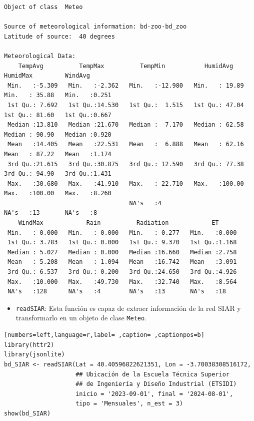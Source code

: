 \begin{verbatim}
Object of class  Meteo 

Source of meteorological information: bd-zoo-bd_zoo 
Latitude of source:  40 degrees

Meteorological Data:
    TempAvg          TempMax          TempMin           HumidAvg         HumidMax         WindAvg     
 Min.   :-5.309   Min.   :-2.362   Min.   :-12.980   Min.   : 19.89   Min.   : 35.88   Min.   :0.251  
 1st Qu.: 7.692   1st Qu.:14.530   1st Qu.:  1.515   1st Qu.: 47.04   1st Qu.: 81.60   1st Qu.:0.667  
 Median :13.810   Median :21.670   Median :  7.170   Median : 62.58   Median : 90.90   Median :0.920  
 Mean   :14.405   Mean   :22.531   Mean   :  6.888   Mean   : 62.16   Mean   : 87.22   Mean   :1.174  
 3rd Qu.:21.615   3rd Qu.:30.875   3rd Qu.: 12.590   3rd Qu.: 77.38   3rd Qu.: 94.90   3rd Qu.:1.431  
 Max.   :30.680   Max.   :41.910   Max.   : 22.710   Max.   :100.00   Max.   :100.00   Max.   :8.260  
                                   NA's   :4                          NA's   :13       NA's   :8      
    WindMax            Rain          Radiation            ET       
 Min.   : 0.000   Min.   : 0.000   Min.   : 0.277   Min.   :0.000  
 1st Qu.: 3.783   1st Qu.: 0.000   1st Qu.: 9.370   1st Qu.:1.168  
 Median : 5.027   Median : 0.000   Median :16.660   Median :2.758  
 Mean   : 5.208   Mean   : 1.094   Mean   :16.742   Mean   :3.091  
 3rd Qu.: 6.537   3rd Qu.: 0.200   3rd Qu.:24.650   3rd Qu.:4.926  
 Max.   :10.000   Max.   :49.730   Max.   :32.740   Max.   :8.564  
 NA's   :128      NA's   :4        NA's   :13       NA's   :18
\end{verbatim}

\begin{itemize}
\item \texttt{readSIAR}: Esta función es capaz de extraer información de la red SIAR y transformarlo en un objeto de clase \texttt{Meteo}.
\end{itemize}
\begin{lstlisting}[numbers=left,language=r,label= ,caption= ,captionpos=b]
library(httr2)
library(jsonlite)
bd_SIAR <- readSIAR(Lat = 40.40596822621351, Lon = -3.70038308516172,
                    ## Ubicación de la Escuela Técnica Superior
                    ## de Ingeniería y Diseño Industrial (ETSIDI)
                    inicio = '2023-09-01', final = '2024-08-01',
                    tipo = 'Mensuales', n_est = 3)
show(bd_SIAR)
\end{lstlisting}

